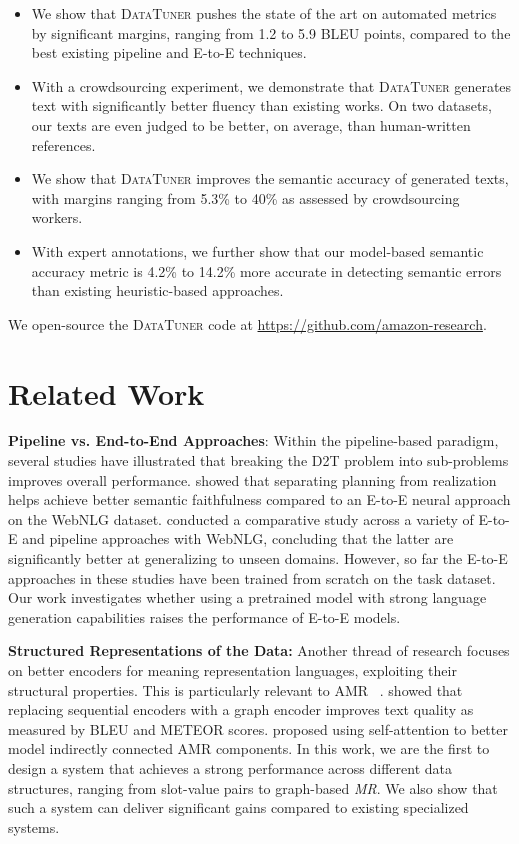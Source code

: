 \documentclass[11pt]{article}
\newcommand{\webnlg}{WebNLG\xspace}
\newcommand{\system}{\textsc{DataTuner}\xspace}
\newcommand{\mr}{\textit{MR}\xspace}
\theoremstyle{definition}
\theoremstyle{break}
\begin{document}
\begin{itemize}
    \item 
    We show that \system pushes the state of the art on automated metrics by significant margins, ranging from 1.2 to 5.9 BLEU points, compared to the best existing pipeline and E-to-E techniques.
    \item
    With a crowdsourcing experiment, we demonstrate that \system generates text with significantly better fluency than existing works. On two datasets, our texts are even judged to be better, on average, than human-written references.
    \item We show that \system improves the semantic accuracy of generated texts, with margins ranging from 5.3\% to 40\% as assessed by crowdsourcing workers.
    \item With expert annotations, we further show that our model-based semantic accuracy metric is 4.2\% to 14.2\% more accurate in detecting semantic errors than existing heuristic-based approaches.
    
\end{itemize}

We open-source the \system code at \url{https://github.com/amazon-research}.

\section{Related Work}

\textbf{Pipeline vs. End-to-End Approaches}:
Within the pipeline-based paradigm, several studies have illustrated that breaking the D2T problem into sub-problems improves overall performance.  showed that separating planning from realization helps achieve better semantic faithfulness compared to an E-to-E neural approach on the \webnlg dataset. 
 conducted a comparative study across a variety of E-to-E and pipeline approaches with \webnlg, concluding that the latter are significantly better at generalizing to unseen domains.
However, so far the E-to-E approaches in these studies have been trained from scratch on the task dataset. 
Our work investigates whether using a pretrained model with strong language generation capabilities raises the performance of E-to-E models. 

\noindent\textbf{Structured Representations of the Data:}
Another thread of research focuses on better encoders for meaning representation languages, exploiting their structural properties. This is particularly relevant to AMR ~\cite{damonte-cohen-2019-structural,ribeiro2019enhancing,zhu-etal-2019-modeling,guo-etal-2019-densely}.  showed that replacing sequential encoders with a graph encoder improves text quality as measured by BLEU and METEOR scores.  proposed using self-attention to better model indirectly connected AMR components. 
In this work, we are the first to design a system that achieves a strong performance across different data structures, ranging from slot-value pairs to graph-based \mr. We also show that such a system can deliver significant gains compared to existing specialized systems.
\end{document}
